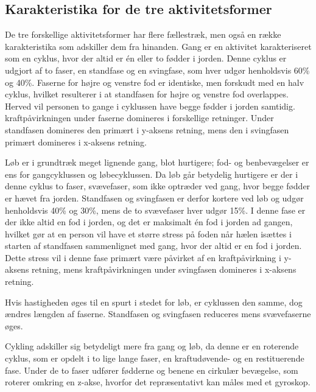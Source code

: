 \subsection{Karakteristika for de tre aktivitetsformer}
De tre forskellige aktivitetsformer har flere fællestræk, men også en række karakteristika som adskiller dem fra hinanden. \newline 
Gang er en aktivitet karakteriseret som en cyklus, hvor der altid er én eller to fødder i jorden. Denne cyklus er udgjort af to faser, en standfase og en svingfase, som hver udgør henholdsvis 60\% og 40\%.
Faserne for højre og venstre fod er identiske, men forskudt med en halv cyklus, hvilket resulterer i at standfasen for højre og venstre fod overlappes. Herved vil personen to gange i cyklussen have begge fødder i jorden samtidig. \newline
kraftpåvirkningen under faserne domineres i forskellige retninger. Under standfasen domineres den primært i y-aksens retning, mens den i svingfasen primært domineres i x-aksens retning.

Løb er i grundtræk meget lignende gang, blot hurtigere; fod- og benbevægelser er ens for gangcyklussen og løbecyklussen. Da løb går betydelig hurtigere er der i denne cyklus to faser, svævefaser, som ikke optræder ved gang, hvor begge fødder er hævet fra jorden. Standfasen og svingfasen er derfor kortere ved løb og udgør henholdsvis 40\% og 30\%, mens de to svævefaser hver udgør 15\%. \newline
I denne fase er der ikke altid en fod i jorden, og det er maksimalt én fod i jorden ad gangen, hvilket gør at en person vil have et større stress på foden når hælen isættes i starten af standfasen sammenlignet med gang, hvor der altid er en fod i jorden. Dette stress vil i denne fase primært være påvirket af en kraftpåvirkning i y-aksens retning, mens kraftpåvirkningen under svingfasen domineres i x-aksens retning.

Hvis hastigheden øges til en spurt i stedet for løb, er cyklussen den samme, dog ændres længden af faserne. Standfasen og svingfasen reduceres mens svævefaserne øges. \citep{Lee1998}

Cykling adskiller sig betydeligt mere fra gang og løb, da denne er en roterende cyklus, som er opdelt i to lige lange faser, en kraftudøvende- og en restituerende fase. Under de to faser udfører fødderne og benene en cirkulær bevægelse, som roterer omkring en z-akse, hvorfor det repræsentativt kan måles med et gyroskop. 
